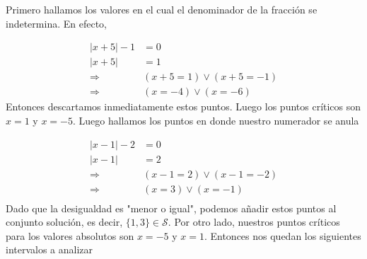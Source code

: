 \documentclass[12pt]{book}
\begin{document}
Primero hallamos los valores en el cual el denominador de la fracción se indetermina. En efecto,

\begin{align*}
    |x+5|-1 &= 0 \\
    |x+5| &=1 \\
\Longrightarrow  & ( x+5 =1 )\vee ( x+5=-1)\\
\Longrightarrow  & ( x=-4 )\vee ( x=-6)
\end{align*}
Entonces descartamos inmediatamente estos puntos. Luego los puntos críticos son $x=1$ y $x=-5$. Luego hallamos los puntos en donde nuestro numerador se anula

\begin{align*}
    |x-1|-2 & = 0 \\
    |x-1|&=2 \\
    \Longrightarrow  & ( x-1 =2 )\vee ( x-1=-2)\\
     \Longrightarrow  & ( x=3 )\vee ( x=-1)\\
\end{align*}
Dado que la desigualdad es "menor o igual", podemos añadir estos puntos al conjunto solución, es decir, $\{1,3\} \in \mathcal{S}$. Por otro lado, nuestros puntos críticos para los valores absolutos son $x=-5$ y $x=1$. Entonces nos quedan los siguientes intervalos a analizar
\end{document}
